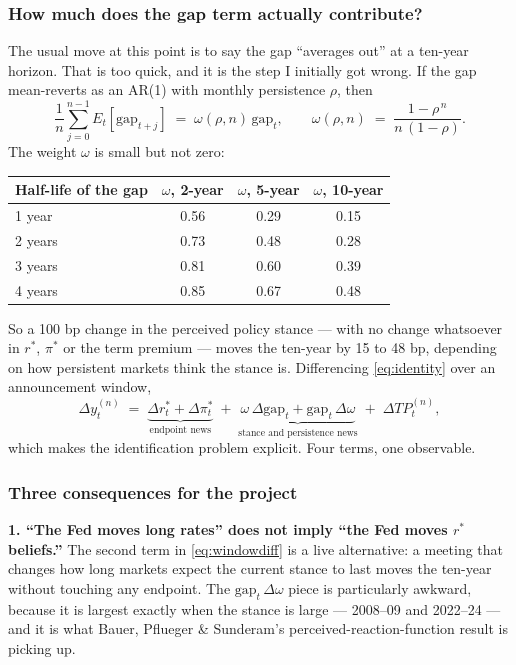 \documentclass[11pt]{article}
\newcommand{\rs}{$r^{*}$}
\begin{document}
\subsubsection*{How much does the gap term actually contribute?}

The usual move at this point is to say the gap ``averages out'' at a ten-year horizon. That
is too quick, and it is the step I initially got wrong. If the gap mean-reverts as an AR(1)
with monthly persistence $\rho$, then
\begin{equation}
\frac{1}{n}\sum_{j=0}^{n-1} E_t\!\left[\text{gap}_{t+j}\right]
\;=\; \omega(\rho,n)\,\text{gap}_t ,
\qquad
\omega(\rho,n) \;=\; \frac{1-\rho^{\,n}}{n\,(1-\rho)} .
\label{eq:omega}
\end{equation}
The weight $\omega$ is small but not zero:

\begin{center}\small
\begin{tabular}{lccc}
\toprule
Half-life of the gap & $\omega$, 2-year & $\omega$, 5-year & $\omega$, 10-year\\ \midrule
1 year  & 0.56 & 0.29 & 0.15\\
2 years & 0.73 & 0.48 & 0.28\\
3 years & 0.81 & 0.60 & 0.39\\
4 years & 0.85 & 0.67 & 0.48\\
\bottomrule\end{tabular}
\end{center}

\noindent So a 100 bp change in the perceived policy stance --- with no change whatsoever in
\rs{}, $\pi^{*}$ or the term premium --- moves the ten-year by 15 to 48 bp, depending on how
persistent markets think the stance is. Differencing \eqref{eq:identity} over an
announcement window,
\begin{equation}
\Delta y^{(n)}_t \;=\; \underbrace{\Delta r^{*}_t + \Delta \pi^{*}_t}_{\text{endpoint news}}
\;+\; \underbrace{\omega\,\Delta\text{gap}_t + \text{gap}_t\,\Delta\omega}_{\text{stance and persistence news}}
\;+\; \Delta TP^{(n)}_t ,
\label{eq:windowdiff}
\end{equation}
which makes the identification problem explicit. Four terms, one observable.

\subsubsection*{Three consequences for the project}

\textbf{1. ``The Fed moves long rates'' does not imply ``the Fed moves \rs{} beliefs.''} The
second term in \eqref{eq:windowdiff} is a live alternative: a meeting that changes how long
markets expect the current stance to last moves the ten-year without touching any endpoint.
The $\text{gap}_t\,\Delta\omega$ piece is particularly awkward, because it is largest exactly
when the stance is large --- 2008--09 and 2022--24 --- and it is what Bauer, Pflueger \&
Sunderam's perceived-reaction-function result is picking up.
\end{document}
